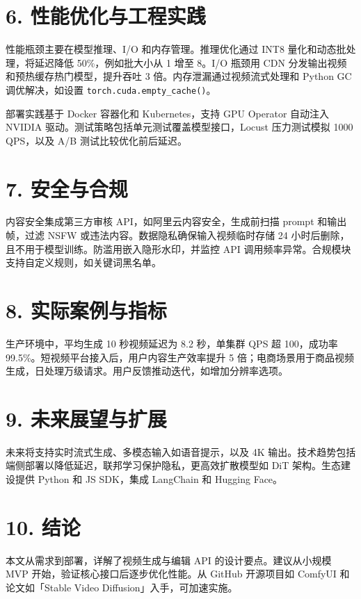 \chapter{6. 性能优化与工程实践}
性能瓶颈主要在模型推理、I/O 和内存管理。推理优化通过 INT8 量化和动态批处理，将延迟降低 50\%{}，例如批大小从 1 增至 8。I/O 瓶颈用 CDN 分发输出视频和预热缓存热门模型，提升吞吐 3 倍。内存泄漏通过视频流式处理和 Python GC 调优解决，如设置 \texttt{torch.cuda.empty\_{}cache()}。\par
部署实践基于 Docker 容器化和 Kubernetes，支持 GPU Operator 自动注入 NVIDIA 驱动。测试策略包括单元测试覆盖模型接口，Locust 压力测试模拟 1000 QPS，以及 A/B 测试比较优化前后延迟。\par
\chapter{7. 安全与合规}
内容安全集成第三方审核 API，如阿里云内容安全，生成前扫描 prompt 和输出帧，过滤 NSFW 或违法内容。数据隐私确保输入视频临时存储 24 小时后删除，且不用于模型训练。防滥用嵌入隐形水印，并监控 API 调用频率异常。合规模块支持自定义规则，如关键词黑名单。\par
\chapter{8. 实际案例与指标}
生产环境中，平均生成 10 秒视频延迟为 8.2 秒，单集群 QPS 超 100，成功率 99.5\%{}。短视频平台接入后，用户内容生产效率提升 5 倍；电商场景用于商品视频生成，日处理万级请求。用户反馈推动迭代，如增加分辨率选项。\par
\chapter{9. 未来展望与扩展}
未来将支持实时流式生成、多模态输入如语音提示，以及 4K 输出。技术趋势包括端侧部署以降低延迟，联邦学习保护隐私，更高效扩散模型如 DiT 架构。生态建设提供 Python 和 JS SDK，集成 LangChain 和 Hugging Face。\par
\chapter{10. 结论}
本文从需求到部署，详解了视频生成与编辑 API 的设计要点。建议从小规模 MVP 开始，验证核心接口后逐步优化性能。从 GitHub 开源项目如 ComfyUI 和论文如「Stable Video Diffusion」入手，可加速实施。\par
